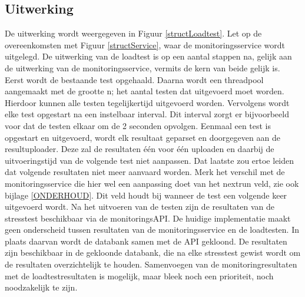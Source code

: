 \subsection{Uitwerking}
\npar
De uitwerking wordt weergegeven in Figuur \ref{structLoadtest}. Let op de overeenkomsten met Figuur \ref{structService}, waar de monitoringsservice wordt uitgelegd. De uitwerking van de loadtest is op een aantal stappen na, gelijk aan de uitwerking van de monitoringsservice, vermits de kern van beide gelijk is. 
\npar
Eerst wordt de bestaande test opgehaald. Daarna wordt een threadpool aangemaakt met de grootte n; het aantal testen dat uitgevoerd moet worden. Hierdoor kunnen alle testen tegelijkertijd uitgevoerd worden. Vervolgens wordt elke test opgestart na een instelbaar interval. Dit interval zorgt er bijvoorbeeld voor dat de testen elkaar om de 2 seconden opvolgen.
\npar
Eenmaal een test is opgestart en uitgevoerd, wordt elk resultaat geparset en doorgegeven aan de resultuploader. Deze zal de resultaten \'e\'en voor \'e\'en uploaden en daarbij de uitvoeringstijd van de volgende test niet aanpassen. Dat laatste zou ertoe leiden dat volgende resultaten niet meer aanvaard worden. Merk het verschil met de monitoringsservice die hier wel een aanpassing doet van het nextrun veld, zie ook bijlage \ref{ONDERHOUD}. Dit veld houdt bij wanneer de test een volgende keer uitgevoerd wordt.
\npar
Na het uitvoeren van de testen zijn de resultaten van de stresstest beschikbaar via de monitoringsAPI. De huidige implementatie maakt geen onderscheid tussen resultaten van de monitoringsservice en de loadtesten. In plaats daarvan wordt de databank samen met de API gekloond. De resultaten zijn beschikbaar in de gekloonde databank, die na elke stresstest gewist wordt om de resultaten overzichtelijk te houden. Samenvoegen van de monitoringresultaten met de loadtestresultaten is mogelijk, maar bleek noch een prioriteit, noch noodzakelijk te zijn.
\clearpage
